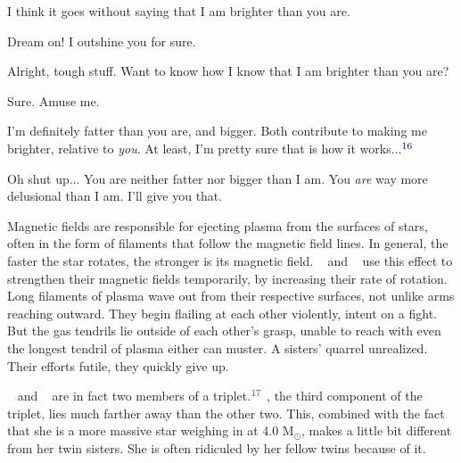 \documentclass[main.tex]{subfiles}
\begin{document}

\par \Taygete I think it goes without saying that I am brighter than you are.

\par \Alcyone Dream on!  I outshine you for sure.

\par \Taygete Alright, tough stuff.  Want to know how I know that I am brighter than you are?

\par \Alcyone Sure.  Amuse me.

\par \Taygete I'm definitely fatter than you are, and bigger.  Both contribute to making me brighter, relative to \textit{you}.  At least, I'm pretty sure that is how it works...$^{\textcolor{blue}{16}}$



\par \Alcyone Oh shut up...  You are neither fatter nor bigger than I am.  You \textit{are} way more delusional than I am.  I'll give you that.

\par \nar Magnetic fields are responsible for ejecting plasma from the surfaces of stars, often in the form of filaments that follow the magnetic field lines.  In general, the faster the star rotates, the stronger is its magnetic field.  \rmtaygete~ and \rmalcyone~ use this effect to strengthen their magnetic fields temporarily, by increasing their rate of rotation.  Long filaments of plasma wave out from their respective surfaces, not unlike arms reaching outward.  They begin flailing at each other violently, intent on a fight.  But the gas tendrils lie outside of each other's grasp, unable to reach with even the longest tendril of plasma either can muster.  A sisters' quarrel unrealized.  Their efforts futile, they quickly give up.  

\par \nar \rmtaygete~ and \rmalcyone~ are in fact two members of a triplet.$^{\textcolor{red}{17}}$  \rmcelaeno, the third component of the triplet, lies much farther away than the other two.  This, combined with the fact that she is a more massive star weighing in at 4.0 M$_{\odot}$, makes \rmcelaeno a little bit different from her twin sisters.  She is often ridiculed by her fellow twins because of it.
\end{document}
